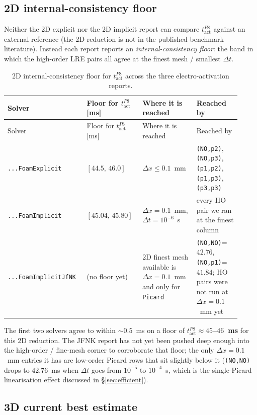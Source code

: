 \documentclass[11pt,a4paper]{article}
\newcommand{\tact}{t_{\text{act}}^{P8}}
\newcommand{\code}[1]{\texttt{\small #1}}
\begin{document}
\subsection{2D internal-consistency floor}

Neither the 2D explicit nor the 2D implicit report can compare $\tact$
against an external reference (the 2D reduction is not in the
published benchmark literature). Instead each report reports an
\emph{internal-consistency floor}: the band in which the high-order
LRE pairs all agree at the finest mesh / smallest $\Delta t$.

\begin{center}\footnotesize
\begin{longtable}{p{0.30\linewidth}p{0.22\linewidth}p{0.22\linewidth}p{0.18\linewidth}}
\caption{2D internal-consistency floor for $\tact$ across the three
electro-activation reports.}\\
\toprule
Solver & Floor for $\tact$ [ms] & Where it is reached & Reached by \\
\midrule\endfirsthead\toprule
Solver & Floor for $\tact$ [ms] & Where it is reached & Reached by \\
\midrule\endhead
\code{...FoamExplicit}        & $[44.5,\,46.0]$  & $\Delta x \le 0.1$~mm        & \code{(NO,p2)}, \code{(NO,p3)}, \code{(p1,p2)}, \code{(p1,p3)}, \code{(p3,p3)} \\
\code{...FoamImplicit}        & $[45.04,\,45.80]$& $\Delta x = 0.1$~mm, $\Delta t = 10^{-6}$~s & every HO pair we ran at the finest column \\
\code{...FoamImplicitJfNK}    & (no floor yet)   & 2D finest mesh available is $\Delta x = 0.1$~mm and only for \code{Picard} & \code{(NO,NO)}=$42.76$, \code{(NO,p1)}=$41.84$; HO pairs were not run at $\Delta x = 0.1$~mm yet \\
\bottomrule
\end{longtable}\end{center}

The first two solvers agree to within $\sim 0.5$~ms on a floor of
\textbf{$\tact \approx 45$--$46$~ms} for this 2D reduction. The JFNK
report has not yet been pushed deep enough into the high-order /
fine-mesh corner to corroborate that floor; the only $\Delta x = 0.1$~mm
entries it has are low-order Picard rows that sit slightly below it
(\code{(NO,NO)} drops to $42.76$~ms when $\Delta t$ goes from
$10^{-5}$ to $10^{-4}$~s, which is the single-Picard linearisation
effect discussed in \S\ref{sec:efficient}).

\subsection{3D current best estimate}
\end{document}
